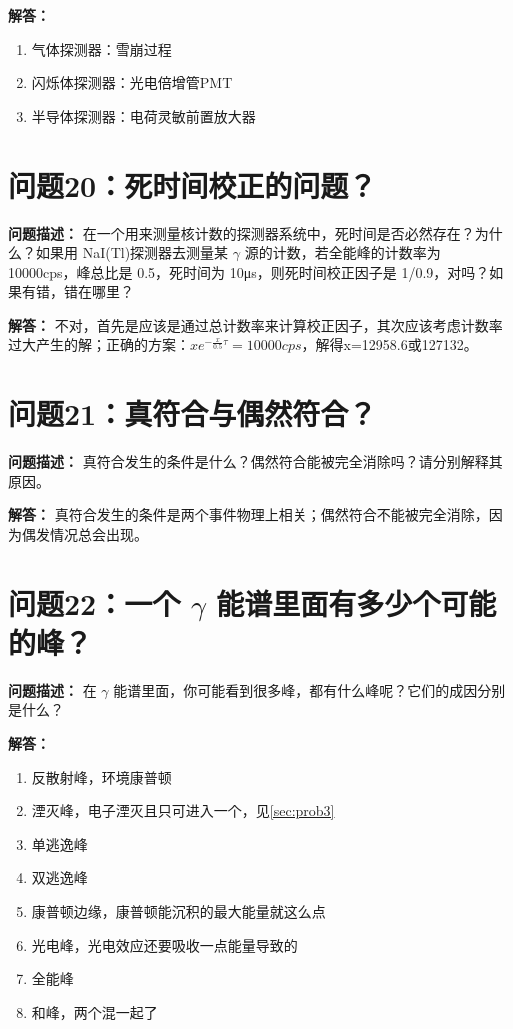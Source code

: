 \documentclass{article}
\begin{document}
\textbf{解答：}

\begin{enumerate}
    \item 气体探测器：雪崩过程
    \item 闪烁体探测器：光电倍增管PMT
    \item 半导体探测器：电荷灵敏前置放大器
\end{enumerate}

\section{问题20：死时间校正的问题？}
\label{sec:prob20}

\textbf{问题描述：} 在一个用来测量核计数的探测器系统中，死时间是否必然存在？为什么？如果用 NaI(Tl)探测器去测量某 $\gamma$ 源的计数，若全能峰的计数率为 10000cps，峰总比是 0.5，死时间为 10μs，则死时间校正因子是 1/0.9，对吗？如果有错，错在哪里？

\textbf{解答：} 不对，首先是应该是通过总计数率来计算校正因子，其次应该考虑计数率过大产生的解；正确的方案：$x e^{-\frac{x}{0.5}\tau}=10000cps$，解得x=12958.6或127132。

\section{问题21：真符合与偶然符合？}
\label{sec:prob21}

\textbf{问题描述：} 真符合发生的条件是什么？偶然符合能被完全消除吗？请分别解释其原因。

\textbf{解答：} 真符合发生的条件是两个事件物理上相关；偶然符合不能被完全消除，因为偶发情况总会出现。

\section{问题22：一个 $\gamma$ 能谱里面有多少个可能的峰？}
\label{sec:prob22}

\textbf{问题描述：} 在 $\gamma$ 能谱里面，你可能看到很多峰，都有什么峰呢？它们的成因分别是什么？

\textbf{解答：}

\begin{enumerate}
    \item 反散射峰，环境康普顿
    \item 湮灭峰，电子湮灭且只可进入一个，见\ref{sec:prob3}
    \item 单逃逸峰
    \item 双逃逸峰
    \item 康普顿边缘，康普顿能沉积的最大能量就这么点
    \item 光电峰，光电效应还要吸收一点能量导致的
    \item 全能峰
    \item 和峰，两个混一起了
\end{enumerate}
\end{document}
